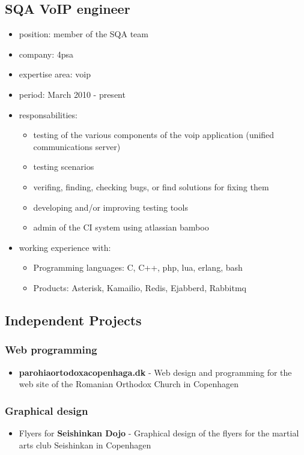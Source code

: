 	\subsection{SQA VoIP engineer}
		\begin{itemize}
			\item position: member of the SQA team
			\item company: 4psa
			\item expertise area: voip 	
			\item period: March 2010 - present
			\item responsabilities: 
				\begin{itemize}
					\item testing of the various components of the voip application (unified communications server) 
					\item testing scenarios 
					\item verifing, finding, checking bugs, or find solutions for fixing them
					\item developing and/or improving testing tools
					\item admin of the CI system using atlassian bamboo
				\end{itemize}
			\item working experience with:
				\begin{itemize}				
					\item Programming languages: C, C++, php, lua, erlang, bash
					\item Products: Asterisk, Kamailio, Redis, Ejabberd, Rabbitmq
				\end{itemize}

		\end{itemize}

	\subsection{Independent Projects}
		\subsubsection{Web programming}
		\begin{itemize}
			\item \textbf{parohiaortodoxacopenhaga.dk} - Web design and programming for the web site of the Romanian Orthodox Church in Copenhagen 
		\end{itemize}

		\subsubsection{Graphical design}
		\begin{itemize}
			\item Flyers for \textbf{Seishinkan Dojo} - Graphical design of the flyers for the martial arts club Seishinkan in Copenhagen
		\end{itemize}
		
